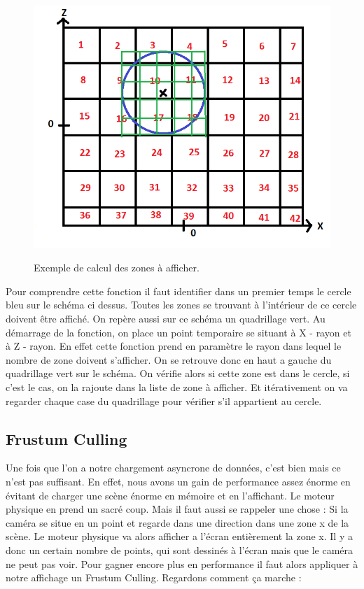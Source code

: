 \documentclass{report}
\begin{document}
			\begin{figure}[!h]
				\centering
				\includegraphics[scale=0.8]{images/calculZone.png}\\
				\caption{Exemple de calcul des zones à afficher.}
				\label{Calcul Zone}
			\end{figure}
			
			Pour comprendre cette fonction il faut identifier dans un premier temps le cercle bleu sur le schéma ci dessus. Toutes les zones se trouvant à l'intérieur de ce cercle doivent être affiché. On repère aussi sur ce schéma un quadrillage vert. Au démarrage de la fonction, on place un point temporaire se situant à X - rayon et à Z - rayon. En effet cette fonction prend en paramètre le rayon dans lequel le nombre de zone doivent s'afficher. On se retrouve donc en haut a gauche du quadrillage vert sur le schéma. On vérifie alors si cette zone est dans le cercle, si c'est le cas, on la rajoute dans la liste de zone à afficher. Et itérativement on va regarder chaque case du quadrillage pour vérifier s'il appartient au cercle.
			
			\subsection{Frustum Culling}
			Une fois que l'on a notre chargement asyncrone de données, c'est bien mais ce n'est pas suffisant. En effet, nous avons un gain de performance assez énorme en évitant de charger une scène énorme en mémoire et en l'affichant. Le moteur physique en prend un sacré coup. Mais il faut aussi se rappeler une chose : Si la caméra se situe en un point et regarde dans une direction dans une zone x de la scène. Le moteur physique va alors afficher a l'écran entièrement la zone x. Il y a donc un certain nombre de points, qui sont dessinés à l'écran mais que le caméra ne peut pas voir. Pour gagner encore plus en performance il faut alors appliquer à notre affichage un Frustum Culling. Regardons comment ça marche : 
			
\end{document}
